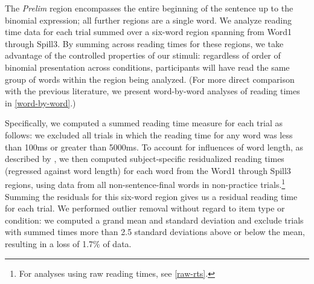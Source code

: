\documentclass[authoryear]{elsarticle}
\begin{document}
\noindent The \emph{Prelim} region encompasses the entire beginning of the sentence up to the binomial expression; all further regions are a single word. We analyze reading time data for each trial summed over a six-word region spanning from Word1 through Spill3. By summing across reading times for these regions, we take advantage of the controlled properties of our stimuli: regardless of order of binomial presentation across conditions, participants will have read the same group of words within the region being analyzed. (For more direct comparison with the previous literature, we present word-by-word analyses of reading times in \ref{word-by-word}.)

Specifically, we computed a summed reading time measure for each trial as follows: we excluded all trials in which the reading time for any word was less than 100ms or greater than 5000ms. To account for influences of word length, as described by \citet{Ferreira:1986vz}, we then computed subject-specific residualized reading times (regressed against word length) for each word from the Word1 through Spill3 regions, using data from all non-sentence-final words in non-practice trials.\footnote{For analyses using raw reading times, see \ref{raw-rts}.} Summing the residuals for this six-word region gives us a residual reading time for each trial. We performed outlier removal without regard to item type or condition: we computed a grand mean and standard deviation and exclude trials with summed times more than 2.5 standard deviations above or below the mean, resulting in a loss of 1.7\% of data.
\end{document}
